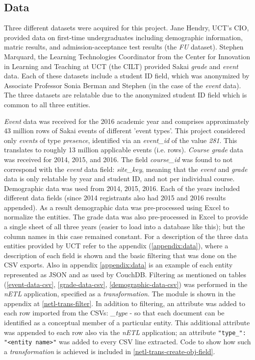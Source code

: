 \subsection{Data}
Three different datasets were acquired for this project. Jane Hendry, UCT's CIO, provided data on first-time undergraduates including demographic information, matric results, and admission-acceptance test results (the \textit{FU} dataset). Stephen Marquard, the Learning Technologies Coordinator from the Center for Innovation in Learning and Teaching at UCT (the CILT) provided Sakai \textit{grade} and \textit{event} data. Each of these datasets include a student ID field, which was anonymized by Associate Professor Sonia Berman and Stephen (in the case of the \textit{event} data). The three datasets are relatable due to the anonymized student ID field which is common to all three entities.

\textit{Event} data was received for the 2016 academic year and comprises approximately 43 million rows of Sakai events of different 'event types'. This project considered only \textit{events} of type \textit{presence}, identified via an \textit{event_id} of the value \textit{281}. This translates to roughly 13 million applicable events (i.e. rows). \textit{Course grade} data was received for 2014, 2015, and 2016. The field \textit{course_id} was found to not correspond with the \textit{event} data field: \textit{site_key}, meaning that the \textit{event} and \textit{grade} data is only relatable by year and student ID, and not per individual course. Demographic data was used from 2014, 2015, 2016. Each of the years included different data fields (since 2014 registrants also had 2015 and 2016 results appended). As a result demographic data was pre-processed using Excel to normalize the entities. The grade data was also pre-processed in Excel to provide a single sheet of all three years (easier to load into a database like this); but the column names in this case remained constant. For a description of the three data entities provided by UCT refer to the appendix (\ref{appendix:data}), where a description of each field is shown and the basic filtering that was done on the CSV exports. Also in appendix \ref{appendix:data} is an example of each entity represented as JSON and as used by CouchDB. Filtering as mentioned on tables (\ref{event-data-csv}, \ref{grade-data-csv}, \ref{demographic-data-csv}) was performed in the \textit{nETL} application, specified as a \textit{transformation}. The module is shown in the appendix at \ref{netl-trans-filter}. In addition to filtering, an attribute was added to each row imported from the CSVs: \textit{\_type} - so that each document can be identified as a conceptual member of a particular entity. This additional attribute was appended to each row also via the \textit{nETL} application; an attribute \texttt{{"type\_": "<entity name>"}} was added to every CSV line extracted. Code to show how such a \textit{transformation} is achieved is included in \ref{netl-trans-create-obj-field}.